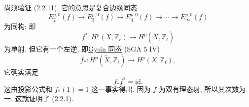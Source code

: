 尚须验证 (2.2.11), 它的意思是复合边缘同态
\begin{equation}\tag{2.2.15}
E_2^{p,0}(f)\longrightarrow E_3^{p,0}(f)
\longrightarrow E_4^{p,0}(f)\longrightarrow\cdots
\longrightarrow E_\infty^{p,0}(f)
\end{equation}
为同构; 即
\begin{equation}\tag{2.2.16}
f^*:H^p(X,\mathbb Z_\ell)
\longrightarrow H^p(\widetilde X,\mathbb Z_\ell)
\end{equation}
为单射. 但它有一个左逆, 即\underline{Gysin 同态} (SGA 5 IV)
\begin{equation}\tag{2.2.17}
f_*:H^p(\widetilde X,\mathbb Z_\ell)
\longrightarrow H^p(X,\mathbb Z_\ell),
\end{equation}
它确实满足
\begin{equation}\tag{2.2.18}
f_*f^*=\mathrm{id}.
\end{equation}
这由投影公式和 $f_*(1)=1$ 这一事实得出, 因为 $f$ 为双有理态射, 所以其次数为一. 这就证明了 (2.2.1).

